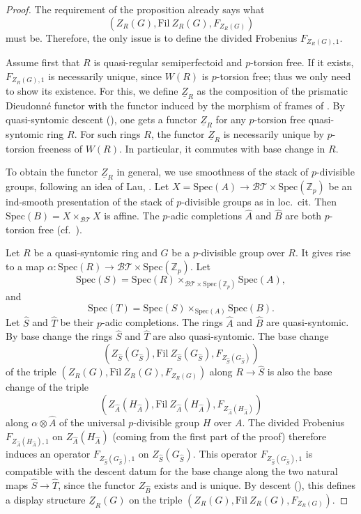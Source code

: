 \documentclass{amsart}
\theoremstyle{plain}
\theoremstyle{definition}
\newcommand{\Z}{\mathbb{Z}}
\newcommand{\red}[1]{{\color{black} #1}}
\begin{document}
\begin{proof}
The requirement of the proposition already says what 
$$(Z_R(G), \mathrm{Fil} ~ Z_R(G), F_{Z_R(G)})$$
must be. Therefore, the only issue is to define the divided Frobenius $F_{Z_R(G),1}$. 

Assume first that $R$ is quasi-regular semiperfectoid and $p$-torsion free. \red{If it exists, $F_{Z_R(G),1}$ is necessarily unique, since $W(R)$ is $p$-torsion free; thus we only need to show its existence.} For this, we define $\underline{Z}_R$ as the composition of the prismatic Dieudonn\'e functor with the functor induced by the morphism of frames of . By quasi-syntomic descent (), one gets a functor $\underline{Z}_R$ for any $p$-torsion free quasi-syntomic ring $R$. For such rings $R$, the functor $\underline{Z}_R$ is necessarily unique by $p$-torsion freeness of $W(R)$. In particular, it commutes with base change in $R$. 

To obtain the functor $\underline{Z}_R$ in general, we use smoothness of the stack of $p$-divisible groups, following an idea of Lau, \cite[Proposition 2.1]{lau_smoothness_of_the_truncated_display_functor}. Let $X=\mathrm{Spec}(A) \to \mathcal{BT} \times \mathrm{Spec}(\Z_p)$ be \red{an ind-smooth} presentation of the stack of $p$-divisible groups as in loc.\ cit. Then $\mathrm{Spec}(B)=X \times_{\mathcal{BT}} X$ is affine. The $p$-adic completions $\hat{A}$ and $\hat{B}$ are both $p$-torsion free (cf.\ \cite[Lemma 1.6]{lau_smoothness_of_the_truncated_display_functor}).

Let $R$ be a quasi-syntomic ring and $G$ be a $p$-divisible group over $R$. It gives rise to a map $\alpha : \mathrm{Spec}(R) \to \mathcal{BT} \times \mathrm{Spec}(\Z_p)$. Let
\[ \mathrm{Spec}(S) = \mathrm{Spec}(R) \times_{\mathcal{BT} \times \mathrm{Spec}(\Z_p)} \mathrm{Spec}(A), \]
and
\[ \mathrm{Spec}(T) = \mathrm{Spec}(S) \times_{\mathrm{Spec}(A)} \mathrm{Spec}(B). \]
Let $\hat{S}$ and $\hat{T}$ be their $p$-adic completions. The rings $\hat{A}$ and $\hat{B}$ \red{are quasi-syntomic}. By base change the rings $\hat{S}$ and $\hat{T}$ are also quasi-syntomic. The base change
\[ (Z_{\hat{S}}(G_{\hat{S}}), \mathrm{Fil} ~ Z_{\hat{S}}(G_{\hat{S}}), F_{Z_{\hat{S}}(G_{\hat{S}})}) \]
of the triple $(Z_R(G), \mathrm{Fil} ~ Z_R(G), F_{Z_R(G)})$ along $R \to \hat{S}$ is also the base change of the triple 
\[ (Z_{\hat{A}}(H_{\hat{A}}), \mathrm{Fil} ~ Z_{\hat{A}}(H_{\hat{A}}), F_{Z_{\hat{A}}(H_{\hat{A}})}) \]
along $\alpha \otimes \hat{A}$ of the universal $p$-divisible group $H$ over $A$. The divided Frobenius $F_{Z_{\hat{A}}(H_{\hat{A}}),1}$ on $Z_{\hat{A}}(H_{\hat{A}})$ (coming from the first part of the proof) therefore induces an operator $F_{Z_{\hat{S}}(G_{\hat{S}}),1}$ on $Z_{\hat{S}}(G_{\hat{S}})$. This operator $F_{Z_{\hat{S}}(G_{\hat{S}}),1}$ is compatible with the descent datum for the base change along the two natural maps $\hat{S} \to \hat{T}$, since the functor $Z_{\hat{B}}$ exists and is unique. By descent (), this defines a display structure $\underline{Z}_R(G)$ on the triple $(Z_R(G), \mathrm{Fil} ~ Z_R(G), F_{Z_R(G)})$.


\end{proof}
\end{document}
